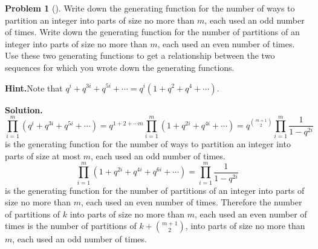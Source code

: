 \documentclass[10pt,]{book}
\theoremstyle{plain}
\theoremstyle{definition}
\newtheorem{activity}[project]{Problem}
\theoremstyle{definition}
\numberwithin{equation}{chapter}
\begin{document}
\begin{activity}[]\label{activity-209}
Write down the generating function for the number of ways to partition an integer into parts of size no more than \(m\), each used an odd number of times. Write down the generating function for the number of partitions of an integer into parts of size no more than \(m\), each used an even number of times. Use these two generating functions to get a relationship between the two sequences for which you wrote down the generating functions.%
\par\medskip\noindent%
\textbf{Hint.}\quad Note that \(q^i + q^{3i} + q^{5i} + \cdots = q^i (1 + q^2 + q^4 + \cdots)\).%
\par\medskip\noindent%
\textbf{Solution.}\quad %
\begin{equation*}
\displaystyle\prod_{i=1}^m (q^i+q^{3i}+q^{5i}+\cdots )= q^{1+2+\cdots m}\prod_{i=1}^m (1+q^{2i}+q^{4i}+\cdots )=q^{\binom{m+1}{2}}\prod_{i=1}^m\frac{1}{1-q^{2i}}
\end{equation*}
is the generating function for the number of ways to partition an integer into parts of size at most \(m\), each used an odd number of times.%
\begin{equation*}
\displaystyle
\prod_{i=1}^m (1 +q^{2i}+q^{4i}+q^{6i}+\cdots )=\prod_{i=1}^m \frac{1}{1-q^{2i}}
\end{equation*}
is the generating function for the number of partitions of an integer into parts of size no more than \(m\), each used an even number of times. Therefore the number of partitions of \(k\) into parts of size no more than \(m\), each used an even number of times is the number of partitions of \(k+\binom{m+1}{2}\), into parts of size no more than \(m\), each used an odd number of times.%
\end{activity}
\end{document}
